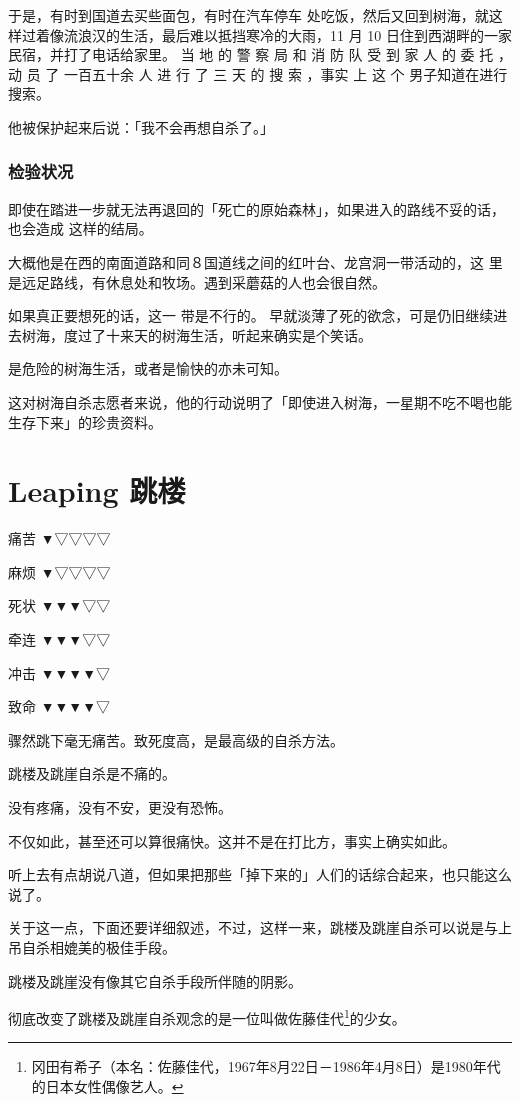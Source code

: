 \documentclass[UTF8]{ctexart}
\begin{document}
于是，有时到国道去买些面包，有时在汽车停车 处吃饭，然后又回到树海，就这样过着像流浪汉的生活，最后难以抵挡寒冷的大雨，11 月 10 日住到西湖畔的一家民宿，并打了电话给家里。 当 地 的 警 察 局 和 消 防 队 受 到 家 人 的 委 托 ，动 员 了 一百五十余 人 进 行 了 三 天 的 搜 索 ，事实 上 这 个 男子知道在进行搜索。

他被保护起来后说：「我不会再想自杀了。」

\subsubsection*{检验状况}

即使在踏进一步就无法再退回的「死亡的原始森林」，如果进入的路线不妥的话，也会造成
这样的结局。

大概他是在西的南面道路和同８国道线之间的红叶台、龙宫洞一带活动的，这
里是远足路线，有休息处和牧场。遇到采蘑菇的人也会很自然。

如果真正要想死的话，这一 带是不行的。 早就淡薄了死的欲念，可是仍旧继续进去树海，度过了十来天的树海生活，听起来确实是个笑话。

是危险的树海生活，或者是愉快的亦未可知。

这对树海自杀志愿者来说，他的行动说明了「即使进入树海，一星期不吃不喝也能生存下来」的珍贵资料。


\section{Leaping 跳楼}

痛苦 ▼▽▽▽▽

麻烦 ▼▽▽▽▽

死状 ▼▼▼▽▽

牵连 ▼▼▼▽▽

冲击 ▼▼▼▼▽

致命 ▼▼▼▼▽

骤然跳下毫无痛苦。致死度高，是最高级的自杀方法。

跳楼及跳崖自杀是不痛的。

没有疼痛，没有不安，更没有恐怖。

不仅如此，甚至还可以算很痛快。这并不是在打比方，事实上确实如此。

听上去有点胡说八道，但如果把那些「掉下来的」人们的话综合起来，也只能这么说了。

关于这一点，下面还要详细叙述，不过，这样一来，跳楼及跳崖自杀可以说是与上吊自杀相媲美的极佳手段。

跳楼及跳崖没有像其它自杀手段所伴随的阴影。

彻底改变了跳楼及跳崖自杀观念的是一位叫做佐藤佳代\footnote{冈田有希子（本名：佐藤佳代，1967年8月22日－1986年4月8日）是1980年代的日本女性偶像艺人。}的少女。
\end{document}
